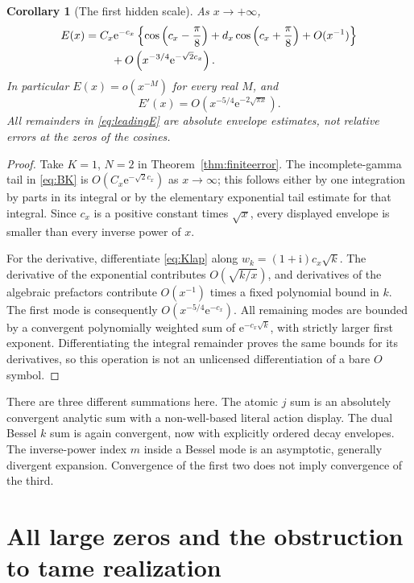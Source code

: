 \documentclass[11pt,a4paper]{article}
\newtheorem{corollary}[theorem]{Corollary}
\theoremstyle{definition}
\theoremstyle{remark}
\newcommand{\e}{\mathrm e}
\newcommand{\ii}{\mathrm i}
\numberwithin{equation}{section}
\begin{document}
\begin{corollary}[The first hidden scale]\label{cor:hidden}
As $x\to+\infty$,
\begin{align}\label{eq:leadingE}
 E(x)={}&C_x\e^{-c_x}
 \left\{\cos\left(c_x-\frac\pi8\right)
       +d_x\cos\left(c_x+\frac\pi8\right)+O(x^{-1})\right\}\\
 &\quad+O\left(x^{-3/4}\e^{-\sqrt2c_x}\right).\notag
\end{align}
In particular $E(x)=o(x^{-M})$ for every real $M$, and
\begin{equation}\label{eq:Eprime}
 E'(x)=O\left(x^{-5/4}\e^{-2\sqrt{\pi x}}\right).
\end{equation}
All remainders in \eqref{eq:leadingE} are absolute envelope estimates, not relative errors at the zeros of the cosines.
\end{corollary}
\begin{proof}
Take $K=1$, $N=2$ in Theorem~\ref{thm:finiteerror}. The incomplete-gamma tail in \eqref{eq:BK} is $O(C_x\e^{-\sqrt2c_x})$ as $x\to\infty$; this follows either by one integration by parts in its integral or by the elementary exponential tail estimate for that integral. Since $c_x$ is a positive constant times $\sqrt{x}$, every displayed envelope is smaller than every inverse power of $x$.

For the derivative, differentiate \eqref{eq:Klap} along $w_k=(1+\ii)c_x\sqrt{k}$. The derivative of the exponential contributes $O(\sqrt{k/x})$, and derivatives of the algebraic prefactors contribute $O(x^{-1})$ times a fixed polynomial bound in $k$. The first mode is consequently $O(x^{-5/4}\e^{-c_x})$. All remaining modes are bounded by a convergent polynomially weighted sum of $\e^{-c_x\sqrt{k}}$, with strictly larger first exponent. Differentiating the integral remainder proves the same bounds for its derivatives, so this operation is not an unlicensed differentiation of a bare $O$ symbol.
\end{proof}

There are three different summations here. The atomic $j$ sum is an absolutely convergent analytic sum with a non-well-based literal action display. The dual Bessel $k$ sum is again convergent, now with explicitly ordered decay envelopes. The inverse-power index $m$ inside a Bessel mode is an asymptotic, generally divergent expansion. Convergence of the first two does not imply convergence of the third.

\section{All large zeros and the obstruction to tame realization}\label{sec:zeros}
\end{document}
